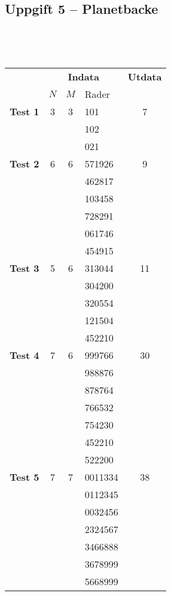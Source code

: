 \documentclass[a4paper,12pt,oneside]{amsbook}
\theoremstyle{test}
\newcommand{\fe}[1]{\textbf{#1}}            %
\begin{document}
\subsection*{Uppgift 5 -- Planetbacke}
~\\
{\tt 
\begin{tabular}{||l||c|c|l||c||}\hline\hline
& \multicolumn{3}{c||}{\fe{Indata}} & \fe{Utdata} \\
& $N$ & $M$ & Rader & \\ \hline \hline
\fe{Test 1} & 3 & 3 & 101 & 7 \\ 
&&&	102 &\\
&&&	021 &\\ \hline
\fe{Test 2} & 6 & 6 & 571926 & 9 \\
&&&	462817 &\\
&&&	103458 &\\
&&&	728291 &\\
&&&	061746 &\\
&&&	454915 &\\ \hline
\fe{Test 3} & 5 & 6 & 313044 & 11 \\
&&&	304200 &\\
&&&	320554 &\\
&&&	121504 &\\
&&&	452210 &\\ \hline
\fe{Test 4} & 7 & 6 & 999766 & 30 \\
&&&	988876 &\\
&&&	878764 &\\
&&&	766532 &\\
&&&	754230 &\\
&&&	452210 &\\
&&&	522200 &\\ \hline
\fe{Test 5} & 7 & 7 & 0011334 & 38 \\
&&&	0112345 &\\
&&&	0032456 &\\
&&&	2324567 &\\
&&&	3466888 &\\
&&&	3678999 &\\
&&&	5668999 &\\ \hline\hline
\end{tabular}
}


\newpage
\end{document}
